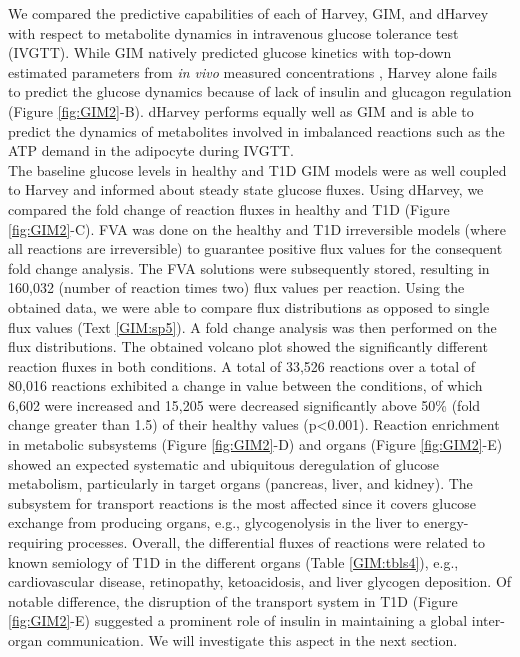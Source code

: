 We compared the predictive capabilities of each of Harvey, GIM, and dHarvey with respect to metabolite dynamics in intravenous glucose tolerance test (IVGTT). While GIM natively predicted glucose kinetics with top-down estimated parameters from \textit{in vivo} measured concentrations \cite{schaller2013generic}, Harvey alone fails to predict the glucose dynamics because of lack of insulin and glucagon regulation (Figure \ref{fig:GIM2}-B). dHarvey performs equally well as GIM and is able to predict the dynamics of metabolites involved in imbalanced reactions such as the ATP demand in the adipocyte during IVGTT.\\ 
The baseline glucose levels in healthy and T1D GIM models were as well coupled to Harvey and informed about steady state glucose fluxes. Using dHarvey, we compared the fold change of reaction fluxes in healthy and T1D (Figure \ref{fig:GIM2}-C). FVA was done on the healthy and T1D irreversible models (where all reactions are irreversible) to guarantee positive flux values for the consequent fold change analysis. The FVA solutions were subsequently stored, resulting in 160,032 (number of reaction times two) flux values per reaction. Using the obtained data, we were able to compare flux distributions as opposed to single flux values (Text \ref{GIM:sp5}). A fold change analysis was then performed on the flux distributions.
The obtained volcano plot showed the significantly different reaction fluxes in both conditions. A total of 33,526 reactions over a total of 80,016 reactions exhibited a change in value between the conditions, of which 6,602 were increased and 15,205 were decreased significantly above 50\% (fold change greater than 1.5) of their healthy values (p<0.001). Reaction enrichment in metabolic subsystems (Figure \ref{fig:GIM2}-D) and organs (Figure \ref{fig:GIM2}-E) showed an expected systematic and ubiquitous deregulation of glucose metabolism, particularly in target organs (pancreas, liver, and kidney). 
The subsystem for transport reactions is the most affected since it covers glucose exchange from producing organs, e.g., glycogenolysis in the liver to energy-requiring processes. Overall, the differential fluxes of reactions were related to known semiology of T1D in the different organs (Table \ref{GIM:tbls4}), e.g., cardiovascular disease, retinopathy, ketoacidosis, and liver glycogen deposition. 
Of notable difference, the disruption of the transport system in T1D (Figure \ref{fig:GIM2}-E) suggested a prominent role of insulin in maintaining a global inter-organ communication. We will investigate this aspect in the next section.

